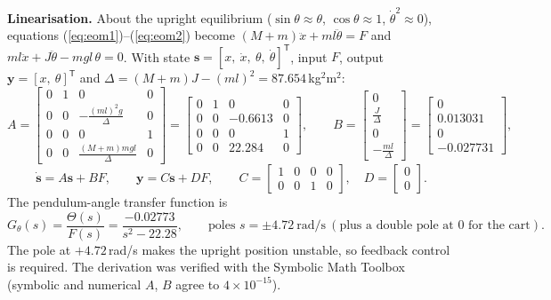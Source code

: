 \documentclass[10pt,a4paper]{article}
\begin{document}
\textbf{Linearisation.} About the upright equilibrium ($\sin\theta\approx\theta$, $\cos\theta\approx1$,
$\dot\theta^2\approx0$), equations (\ref{eq:eom1})--(\ref{eq:eom2}) become
$(M+m)\ddot x + ml\ddot\theta = F$ and $ml\ddot x + J\ddot\theta - mgl\,\theta = 0$. With state
$\mathbf s=[x,\ \dot x,\ \theta,\ \dot\theta]^\mathsf T$, input $F$, output $\mathbf y=[x,\ \theta]^\mathsf T$ and
$\Delta=(M+m)J-(ml)^2 = 87.654$\,kg$^2$m$^2$:
\begin{equation}
A=\begin{bmatrix} 0&1&0&0\\ 0&0&-\frac{(ml)^2g}{\Delta}&0\\ 0&0&0&1\\ 0&0&\frac{(M+m)mgl}{\Delta}&0\end{bmatrix}
=\begin{bmatrix} 0&1&0&0\\ 0&0&-0.6613&0\\ 0&0&0&1\\ 0&0&22.284&0\end{bmatrix},\qquad
B=\begin{bmatrix}0\\ \frac{J}{\Delta}\\ 0\\ -\frac{ml}{\Delta}\end{bmatrix}=\begin{bmatrix}0\\ 0.013031\\ 0\\ -0.027731\end{bmatrix},
\end{equation}
\begin{equation}
\dot{\mathbf s} = A\mathbf s + BF,\qquad \mathbf y = C\mathbf s + DF,\qquad
C=\begin{bmatrix}1&0&0&0\\0&0&1&0\end{bmatrix},\quad D=\begin{bmatrix}0\\0\end{bmatrix}.
\end{equation}
The pendulum-angle transfer function is
\begin{equation}
G_\theta(s)=\frac{\Theta(s)}{F(s)} = \frac{-0.02773}{s^2-22.28},\qquad \text{poles } s=\pm4.72\ \text{rad/s}
\ (\text{plus a double pole at } 0 \text{ for the cart}).
\end{equation}
The pole at $+4.72$\,rad/s makes the upright position unstable, so feedback control is required. The
derivation was verified with the Symbolic Math Toolbox (symbolic and numerical $A$, $B$ agree to
$4\times10^{-15}$).
\end{document}
